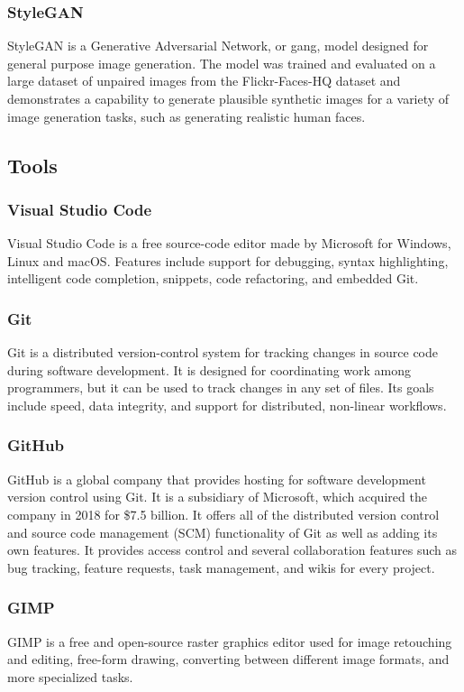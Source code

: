 \subsubsection*{StyleGAN}
\label{subsubsec:stylegan}
StyleGAN is a Generative Adversarial Network, or \gls{gang}, model designed for
general purpose image generation. The model was trained and evaluated on a large
dataset of unpaired images from the Flickr-Faces-HQ dataset and demonstrates a
capability to generate plausible synthetic images for a variety of image
generation tasks, such as generating realistic human faces.

\subsection*{Tools}
\label{subsec:tools}
\subsubsection*{Visual Studio Code}
\label{subsubsec:vscode}
Visual Studio Code is a free source-code editor made by Microsoft for Windows,
Linux and macOS. Features include support for debugging, syntax highlighting,
intelligent code completion, snippets, code refactoring, and embedded Git.
\subsubsection*{Git}
\label{subsubsec:git}
Git is a distributed version-control system for tracking changes in source code
during software development. It is designed for coordinating work among
programmers, but it can be used to track changes in any set of files. Its goals
include speed, data integrity, and support for distributed, non-linear
workflows.
\subsubsection*{GitHub}
\label{subsubsec:github}
GitHub is a global company that provides hosting for software development
version control using Git. It is a subsidiary of Microsoft, which acquired the
company in 2018 for \$7.5 billion. It offers all of the distributed version
control and source code management (SCM) functionality of Git as well as adding
its own features. It provides access control and several collaboration features
such as bug tracking, feature requests, task management, and wikis for every
project.
\subsubsection*{GIMP}
\label{subsubsec:gimp}
GIMP is a free and open-source raster graphics editor used for image retouching
and editing, free-form drawing, converting between different image formats, and
more specialized tasks.
